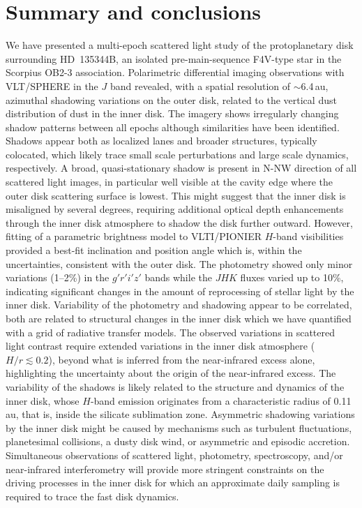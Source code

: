 \documentclass[twocolumn,tighten]{aastex61}
\begin{document}
\section{Summary and conclusions}

We have presented a multi-epoch scattered light study of the protoplanetary disk surrounding HD~135344B, an isolated pre-main-sequence F4V-type star in the Scorpius \mbox{OB2-3} association. Polarimetric differential imaging observations with VLT/SPHERE in the $J$ band revealed, with a spatial resolution of $\sim$6.4\,au, azimuthal shadowing variations on the outer disk, related to the vertical dust distribution of dust in the inner disk. The imagery shows irregularly changing shadow patterns between all epochs although similarities have been identified. Shadows appear both as localized lanes and broader structures, typically colocated, which likely trace small scale perturbations and large scale dynamics, respectively. A broad, quasi-stationary shadow is present in N-NW direction of all scattered light images, in particular well visible at the cavity edge where the outer disk scattering surface is lowest. This might suggest that the inner disk is misaligned by several degrees, requiring additional optical depth enhancements through the inner disk atmosphere to shadow the disk further outward. However, fitting of a parametric brightness model to VLTI/PIONIER $H$-band visibilities provided a best-fit inclination and position angle which is, within the uncertainties, consistent with the outer disk. The photometry showed only minor variations (1--2\%) in the $g'r'i'z'$ bands while the $JHK$ fluxes varied up to 10\%, indicating significant changes in the amount of reprocessing of stellar light by the inner disk. Variability of the photometry and shadowing appear to be correlated, both are related to structural changes in the inner disk which we have quantified with a grid of radiative transfer models. The observed variations in scattered light contrast require extended variations in the inner disk atmosphere ($H/r \lesssim 0.2$), beyond what is inferred from the near-infrared excess alone, highlighting the uncertainty about the origin of the near-infrared excess. The variability of the shadows is likely related to the structure and dynamics of the inner disk, whose $H$-band emission originates from a characteristic radius of 0.11\,au, that is, inside the silicate sublimation zone. Asymmetric shadowing variations by the inner disk might be caused by mechanisms such as turbulent fluctuations, planetesimal collisions, a dusty disk wind, or asymmetric and episodic accretion. Simultaneous observations of scattered light, photometry, spectroscopy, and/or near-infrared interferometry will provide more stringent constraints on the driving processes in the inner disk for which an approximate daily sampling is required to trace the fast disk dynamics.
\end{document}
